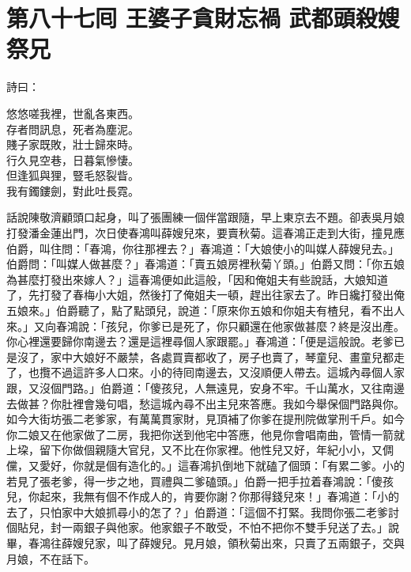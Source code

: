 
\chapter*{第八十七囘 王婆子貪財忘禍 武都頭殺嫂祭兄}


詩曰：

\begin{myquote}
悠悠嗟我裡，世亂各東西。\\存者問訊息，死者為塵泥。\\賤子家既敗，壯士歸來時。\\行久見空巷，日暮氣慘悽。\\但逢狐與狸，豎毛怒裂眥。\\我有鐲鏤劍，對此吐長霓。
\end{myquote}

話說陳敬濟顧頭口起身，叫了張團練一個伴當跟隨，早上東京去不題。卻表吳月娘打發潘金蓮出門，次日使春鴻叫薛嫂兒來，要賣秋菊。這春鴻正走到大街，撞見應伯爵，叫住問：「春鴻，你往那裡去？」春鴻道：「大娘使小的叫媒人薛嫂兒去。」伯爵問：「叫媒人做甚麼？」春鴻道：「賣五娘房裡秋菊丫頭。」伯爵又問：「你五娘為甚麼打發出來嫁人？」這春鴻便如此這般，「因和俺姐夫有些說話，大娘知道了，先打發了春梅小大姐，然後打了俺姐夫一頓，趕出往家去了。昨日纔打發出俺五娘來。」伯爵聽了，點了點頭兒，說道：「原來你五娘和你姐夫有楂兒，看不出人來。」又向春鴻說：「孩兒，你爹已是死了，你只顧還在他家做甚麼？終是沒出產。你心裡還要歸你南邊去？還是這裡尋個人家跟罷。」春鴻道：「便是這般說。老爹已是沒了，家中大娘好不嚴禁，各處買賣都收了，房子也賣了，琴童兒、畫童兒都走了，也攬不過這許多人口來。小的待囘南邊去，又沒順便人帶去。這城內尋個人家跟，又沒個門路。」伯爵道：「傻孩兒，人無遠見，安身不牢。{}千山萬水，又往南邊去做甚？你肚裡會幾句唱，愁這城內尋不出主兒來答應。我如今舉保個門路與你。如今大街坊張二老爹家，有萬萬貫家財，見頂補了你爹在提刑院做掌刑千戶。如今你二娘又在他家做了二房，我把你送到他宅中答應，他見你會唱南曲，管情一箭就上垜，留下你做個親隨大官兒，又不比在你家裡。他性兒又好，年紀小小，又倜儻，又愛好，你就是個有造化的。」這春鴻扒倒地下就磕了個頭：「有累二爹。小的若見了張老爹，得一步之地，買禮與二爹磕頭。」伯爵一把手拉着春鴻說：「傻孩兒，你起來，我無有個不作成人的，肯要你謝？你那得錢兒來！」春鴻道：「小的去了，只怕家中大娘抓尋小的怎了？」伯爵道：「這個不打緊。我問你張二老爹討個貼兒，封一兩銀子與他家。他家銀子不敢受，不怕不把你不雙手兒送了去。」說畢，春鴻往薛嫂兒家，叫了薛嫂兒。見月娘，領秋菊出來，只賣了五兩銀子，交與月娘，不在話下。

